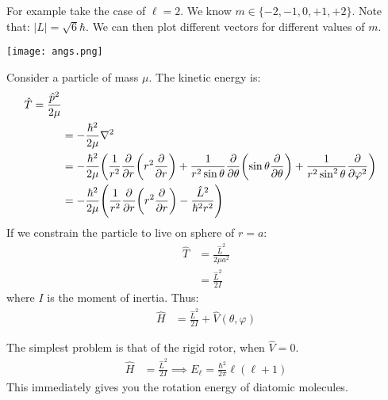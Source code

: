 For example take the case of $\ell = 2$. We know $m \in \{-2, -1, 0, +1, +2\}$. Note that: $|L| = \sqrt{6} \hbar$.
We can then plot different vectors for different values of $m$.

\texttt{[image: angs.png]}

Consider a particle of mass $\mu$. The kinetic energy is:
\begin{align*}
    \hat{T} = \frac{\hat{p}^2}{2 \mu} \\
    &= -\frac{\hbar^2}{2\mu} \nabla^2 \\
    &= -\frac{\hbar^2}{2\mu} \qty(\frac{1}{r^2} \pdv{}{r} \qty(r^2 \pdv{}{r}) + \frac{1}{r^2 \sin \theta} \pdv{}{\theta} \qty(\sin \theta \pdv{}{\theta}) + \frac{1}{r^2 \sin^2 \theta} \pdv{}{\varphi^2}) \\
    &= -\frac{\hbar^2}{2\mu} \qty(\frac{1}{r^2} \pdv{}{r} \qty(r^2 \pdv{}{r}) - \frac{\hat{L}^2}{\hbar^2 r^2})
\end{align*}
If we constrain the particle to live on sphere of $r = a$:
\begin{align*}
    \hat{T} &=\frac{\hat{L}^2}{2 \mu a^2} \\
    &= \frac{\hat{L}^2}{2I}
\end{align*}
where $I$ is the moment of inertia. Thus:
\begin{align*}
    \hat{H} &= \frac{\hat{L}^2}{2I} + \hat{V}(\theta, \varphi)
\end{align*}

The simplest problem is that of the rigid rotor, when $\hat{V} = 0$.
\begin{align*}
    \hat{H} &= \frac{\hat{L}^2}{2I} \implies E_{\ell} = \frac{\hbar^2}{2\pi} \ell (\ell + 1)
\end{align*}
This immediately gives you the rotation energy of diatomic molecules.

